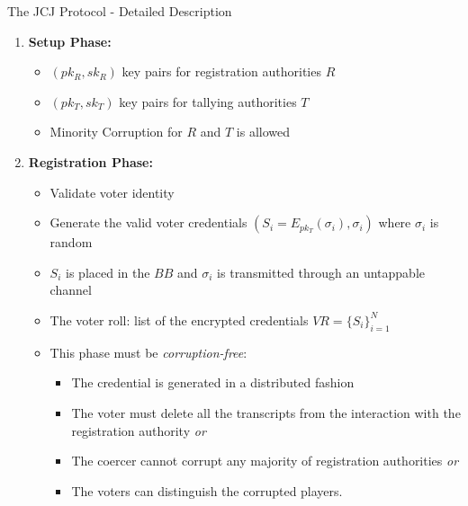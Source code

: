 \documentclass{beamer}
\begin{document}
\begin{frame}{The JCJ Protocol - Detailed Description}
\begin{enumerate}

\item \textbf{Setup Phase:}
\begin{itemize}
\item $(pk_R,sk_R)$ key pairs for registration authorities $R$
\item $(pk_T,sk_T)$ key pairs for tallying authorities $T$
\item Minority Corruption for  $R$ and $T$ is allowed
\end{itemize} 

\item \textbf{Registration Phase:}
\begin{itemize}
\item Validate voter identity 
\item Generate the valid voter credentials $(S_i = E_{pk_T}(\sigma_i),\sigma_i)$ where $\sigma_i$ is random 
\item $S_i$ is placed in the $BB$ and $\sigma_i$ is transmitted through an untappable channel
\item The voter roll: list of the encrypted credentials $VR=\{S_i\}_{i=1}^N$
\item This phase must be \textit{corruption-free}:
\begin{itemize}
\item The credential is generated in a distributed fashion
\item The voter must delete all the transcripts from the interaction with the registration authority \textit{or}
\item The coercer cannot corrupt any majority of registration authorities \textit{or}
\item The voters can distinguish the corrupted players.
\end{itemize}
\end{itemize}

\framebreak


\end{enumerate}
\end{frame}
\end{document}
